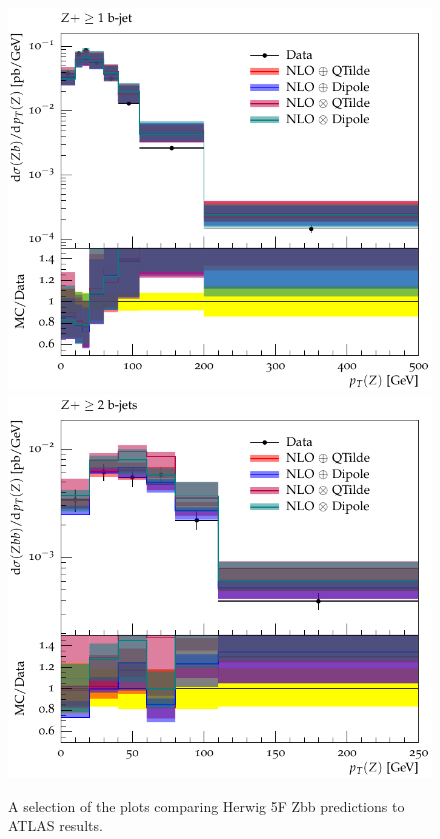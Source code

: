 \documentclass[11pt]{cernrep} \usepackage{graphicx,epsfig} 
\begin{document}
\begin{figure}[htbp]
\begin{center}
   \includegraphics[scale=0.65]{figs/zbb/herwigzbb/d15-x01-y01.pdf} 
   \includegraphics[scale=0.65]{figs/zbb/herwigzbb/d25-x01-y01.pdf} 
\caption{A selection of the plots comparing Herwig 5F Zbb predictions to ATLAS results.}
\label{zbb-herwigzbb-atlas}
\end{center}
\end{figure}
\end{document}
